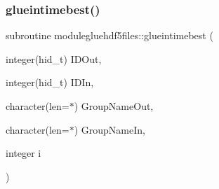 \subsubsection{\texorpdfstring{glueintimebest()}{glueintimebest()}}
{\footnotesize\ttfamily subroutine modulegluehdf5files\+::glueintimebest (\begin{DoxyParamCaption}\item[{integer(hid\+\_\+t)}]{I\+D\+Out,  }\item[{integer(hid\+\_\+t)}]{I\+D\+In,  }\item[{character(len=$\ast$)}]{Group\+Name\+Out,  }\item[{character(len=$\ast$)}]{Group\+Name\+In,  }\item[{integer}]{i }\end{DoxyParamCaption})\hspace{0.3cm}{\ttfamily [private]}}

